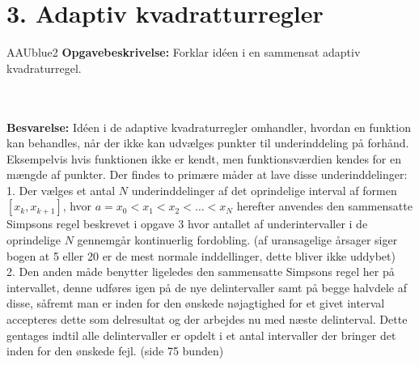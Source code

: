 \section*{3. Adaptiv kvadratturregler}
%
% 
%
\begin{color}{AAUblue2}
%
\textbf{Opgavebeskrivelse:} 
Forklar idéen i en sammensat adaptiv kvadraturregel.
% 
\end{color}
\\\\
% 
\textbf{Besvarelse:} 
Idéen i de adaptive kvadraturregler omhandler, hvordan en funktion kan behandles, når der ikke kan udvælges punkter til underinddeling på forhånd. Eksempelvis hvis funktionen ikke er kendt, men funktionsværdien kendes for en mængde af punkter.
Der findes to primære måder at lave disse underinddelinger: \\
1. Der vælges et antal $N$ underinddelinger af det oprindelige interval af formen $\left [  x_k, x_{k+1} \right ]$, hvor $a=x_0<x_1<x_2<\ldots<x_N$ herefter anvendes den sammensatte Simpsons regel beskrevet i opgave 3 hvor antallet af underintervaller i de oprindelige $N$ gennemgår kontinuerlig fordobling.
(af uransagelige årsager siger bogen at 5 eller 20 er de mest normale inddellinger, dette bliver ikke uddybet) \\
2. Den anden måde benytter ligeledes den sammensatte Simpsons regel her på intervallet, denne udføres igen på de nye delintervaller samt på begge halvdele af disse, såfremt man er inden for den ønskede nøjagtighed for et givet interval accepteres dette som delresultat og der arbejdes nu med næste delinterval.
Dette gentages indtil alle delintervaller er opdelt i et antal intervaller der bringer det inden for den ønskede fejl.
(side 75 bunden)
%
